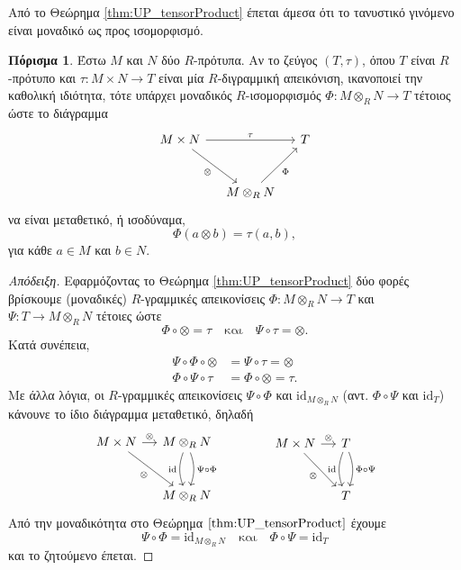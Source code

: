 \documentclass[12pt,a4paper,reqno]{amsart}
\theoremstyle{definition}
\newtheorem{corollary}[theorem]{Πόρισμα}
\theoremstyle{remark}
\numberwithin{theorem}{section}
\numberwithin{exercise}{section}
\numberwithin{equation}{section}
\renewcommand{\to}{\rightarrow}
\newcommand{\rmid}{\mathrm{id}}
\begin{document}
Από το Θεώρημα \ref{thm:UP_tensorProduct} έπεται άμεσα ότι το τανυστικό γινόμενο είναι μοναδικό ως προς ισομορφισμό.

\begin{corollary}
    \label{cor:tensorProduct}
    Έστω $M$ και $N$ δύο $R$-πρότυπα. Αν το ζεύγος $(T, \tau)$, όπου $T$ είναι $R$-πρότυπο και $\tau : M \times N \to T$ είναι μία $R$-διγραμμική απεικόνιση, ικανοποιεί την καθολική ιδιότητα, τότε υπάρχει μοναδικός $R$-ισομορφισμός $\Phi : M \otimes_R N \to T$ τέτοιος ώστε το διάγραμμα
    \[
    \begin{tikzcd}[column sep=small, row sep=large]
    M \times N 
    \arrow[rr, "\tau"] 
    \arrow[dr, "\otimes"'] 
    & 
    & T \\
    & M \otimes_R N 
    \arrow[ur, "\Phi"'] 
    &
    \end{tikzcd}
    \]
    να είναι μεταθετικό, ή ισοδύναμα, 
    \[
    \Phi(a\otimes b) = \tau(a,b),
    \]
    για κάθε $a \in M$ και $b \in N$.
\end{corollary}

\begin{proof}[Απόδειξη]
    Εφαρμόζοντας το Θεώρημα \ref{thm:UP_tensorProduct} δύο φορές βρίσκουμε (μοναδικές) $R$-γραμμικές απεικονίσεις $\Phi : M \otimes_R N \to T$ και $\Psi : T \to M \otimes_R N$ τέτοιες ώστε 
    \[
    \Phi \circ \otimes = \tau \quad \text{και} \quad 
    \Psi\circ\tau = \otimes.
    \]
    Κατά συνέπεια, 
    \begin{align*}
        \Psi\circ\Phi\circ\otimes &= \Psi\circ\tau = \otimes \\
        \Phi\circ\Psi\circ\tau &= \Phi\circ\otimes = \tau.
    \end{align*}
    Με άλλα λόγια, οι $R$-γραμμικές απεικονίσεις $\Psi\circ\Phi$ και $\rmid_{M\otimes_RN}$ (αντ. $\Phi\circ\Psi$ και $\rmid_T$) κάνουνε το ίδιο διάγραμμα μεταθετικό, δηλαδή 
    \[
    \begin{array}{ccccc}
        \begin{tikzcd}[column sep=small, row sep=large]
        M \times N 
        \arrow[r, "\otimes"] 
        \arrow[dr, "\otimes"'] 
        & M \otimes_R N 
        \arrow[d, bend left=20, "\Psi\circ\Phi"] 
        \arrow[d, bend right=20, "\rmid"'] \\
        & M \otimes_R N  
        \end{tikzcd}
        & & & &
        \begin{tikzcd}[column sep=small, row sep=large]
        M \times N 
        \arrow[r, "\otimes"] 
        \arrow[dr, "\otimes"'] 
        & T
        \arrow[d, bend left=20, "\Phi\circ\Psi"] 
        \arrow[d, bend right=20, "\rmid"'] \\
        & T  
        \end{tikzcd}    
    \end{array}
    \]
    Aπό την μοναδικότητα στο Θεώρημα $\ref{thm:UP_tensorProduct}$ έχουμε 
    \[
    \Psi\circ\Phi = \rmid_{M\otimes_RN} \quad \text{και} \quad 
    \Phi\circ\Psi = \rmid_T
    \]
    και το ζητούμενο έπεται.
\end{proof}
\end{document}
